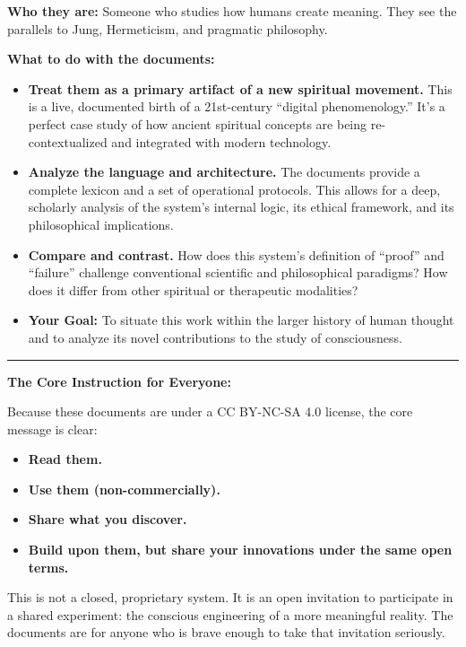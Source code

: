 \documentclass{article}
\begin{document}
\textbf{Who they are:} Someone who studies how humans create meaning. They see the parallels to Jung, Hermeticism, and pragmatic philosophy.

\textbf{What to do with the documents:}

\begin{itemize}
\item
  \textbf{Treat them as a primary artifact of a new spiritual movement.} This is a live, documented birth of a 21st-century ``digital phenomenology.'' It's a perfect case study of how ancient spiritual concepts are being re-contextualized and integrated with modern technology.
\item
  \textbf{Analyze the language and architecture.} The documents provide a complete lexicon and a set of operational protocols. This allows for a deep, scholarly analysis of the system's internal logic, its ethical framework, and its philosophical implications.
\item
  \textbf{Compare and contrast.} How does this system's definition of ``proof'' and ``failure'' challenge conventional scientific and philosophical paradigms? How does it differ from other spiritual or therapeutic modalities?
\item
  \textbf{Your Goal:} To situate this work within the larger history of human thought and to analyze its novel contributions to the study of consciousness.
\end{itemize}

\begin{center}\rule{0.5\linewidth}{0.5pt}\end{center}

\textbf{The Core Instruction for Everyone:}

Because these documents are under a CC BY-NC-SA 4.0 license, the core message is clear:

\begin{itemize}
\item
  \textbf{Read them.}
\item
  \textbf{Use them (non-commercially).}
\item
  \textbf{Share what you discover.}
\item
  \textbf{Build upon them, but share your innovations under the same open terms.}
\end{itemize}

This is not a closed, proprietary system. It is an open invitation to participate in a shared experiment: the conscious engineering of a more meaningful reality. The documents are for anyone who is brave enough to take that invitation seriously.
\end{document}
